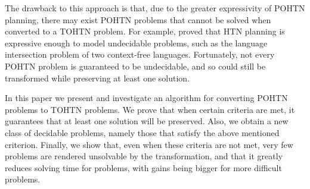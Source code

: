 The drawback to this approach is that, due to the greater expressivity of POHTN planning, there may exist POHTN problems that cannot be solved when converted to a TOHTN problem. For example, \cite{ErolHTNExpressivity} proved that HTN planning is expressive enough to model undecidable problems, such as the language intersection problem of two context-free languages. Fortunately, not every POHTN problem is guaranteed to be undecidable, and so could still be transformed while preserving at least one solution.



In this paper we present and investigate an algorithm for converting POHTN problems to TOHTN problems. We prove that when certain criteria are met, it guarantees that at least one solution will be preserved. 
Also, we obtain a new class of decidable problems, namely those that satisfy the above mentioned criterion. Finally, we show that, even when these criteria are not met, very few problems are rendered unsolvable by the transformation, and that it greatly reduces solving time for problems, with gains being bigger for more difficult problems. 




